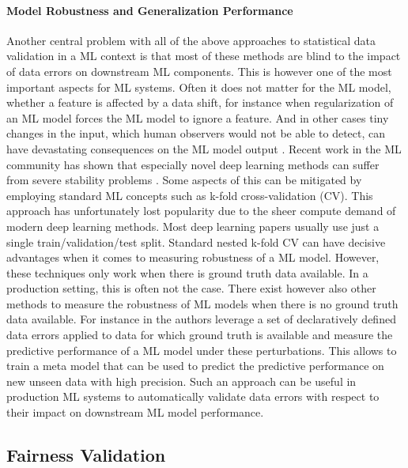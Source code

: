 \paragraph{Model Robustness and Generalization Performance}
Another central problem with all of the above approaches to statistical data validation in a ML context is that most of these methods are blind to the impact of data errors on downstream ML components. This is however one of the most important aspects for ML systems. Often it does not matter for the ML model, whether a feature is affected by a data shift, for instance when regularization of an ML model forces the ML model to ignore a feature. And in other cases tiny changes in the input, which human observers would not be able to detect, can have devastating consequences on the ML model output \cite{Athalye18}. Recent work in the ML community has shown that especially novel deep learning methods can suffer from severe stability problems \cite{DAmour2020}. Some aspects of this can be mitigated by employing standard ML concepts such as k-fold cross-validation (CV). This approach has unfortunately lost popularity due to the sheer compute demand of modern deep learning methods. Most deep learning papers usually use just a single train/validation/test split. Standard nested k-fold CV can have decisive advantages when it comes to measuring robustness of a ML model. However, these techniques only work when there is ground truth data available. In a production setting, this is often not the case. There exist however also other methods to measure the robustness of ML models when there is no ground truth data available. For instance in \cite{Schelter2020} the authors leverage a set of declaratively defined data errors applied to data for which ground truth is available and measure the predictive performance of a ML model under these perturbations. This allows to train a meta model that can be used to predict the predictive performance on new unseen data with high precision. Such an approach can be useful in production ML systems to automatically validate data errors with respect to their impact on downstream ML model performance.

\subsection{Fairness Validation}

